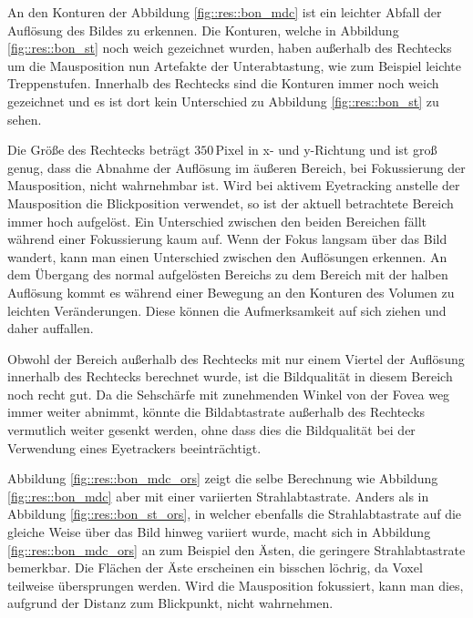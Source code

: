 An den Konturen der Abbildung \ref{fig::res::bon_mdc} ist ein leichter Abfall der Auflösung des Bildes zu erkennen.
Die Konturen, welche in Abbildung \ref{fig::res::bon_st} noch weich gezeichnet wurden, haben außerhalb des Rechtecks um die Mausposition nun Artefakte der Unterabtastung, wie zum Beispiel leichte Treppenstufen.
Innerhalb des Rechtecks sind die Konturen immer noch weich gezeichnet und es ist dort kein Unterschied zu Abbildung \ref{fig::res::bon_st} zu sehen.

Die Größe des Rechtecks beträgt $350$\,Pixel in x- und y-Richtung und ist groß genug, dass die Abnahme der Auflösung im äußeren Bereich, bei Fokussierung der Mausposition, nicht wahrnehmbar ist.
Wird bei aktivem Eyetracking anstelle der Mausposition die Blickposition verwendet, so ist der aktuell betrachtete Bereich immer hoch aufgelöst.
Ein Unterschied zwischen den beiden Bereichen fällt während einer Fokussierung kaum auf.
Wenn der Fokus langsam über das Bild wandert, kann man einen Unterschied zwischen den Auflösungen erkennen.
An dem Übergang des normal aufgelösten Bereichs zu dem Bereich mit der halben Auflösung kommt es während einer Bewegung an den Konturen des Volumen zu leichten Veränderungen.
Diese können die Aufmerksamkeit auf sich ziehen und daher auffallen.

Obwohl der Bereich außerhalb des Rechtecks mit nur einem Viertel der Auflösung innerhalb des Rechtecks berechnet wurde, ist die Bildqualität in diesem Bereich noch recht gut.
Da die Sehschärfe mit zunehmenden Winkel von der Fovea weg immer weiter abnimmt, könnte die Bildabtastrate außerhalb des Rechtecks vermutlich weiter gesenkt werden, ohne dass dies die Bildqualität bei der Verwendung eines Eyetrackers beeinträchtigt.

Abbildung \ref{fig::res::bon_mdc_ors} zeigt die selbe Berechnung wie Abbildung \ref{fig::res::bon_mdc} aber mit einer variierten Strahlabtastrate.
Anders als in Abbildung \ref{fig::res::bon_st_ors}, in welcher ebenfalls die Strahlabtastrate auf die gleiche Weise über das Bild hinweg variiert wurde, macht sich in Abbildung \ref{fig::res::bon_mdc_ors} an zum Beispiel den Ästen, die geringere Strahlabtastrate bemerkbar.
Die Flächen der Äste erscheinen ein bisschen löchrig, da Voxel teilweise übersprungen werden.
Wird die Mausposition fokussiert, kann man dies, aufgrund der Distanz zum Blickpunkt, nicht wahrnehmen.

